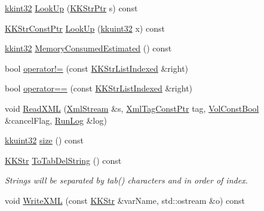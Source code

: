 \begin{DoxyCompactItemize}
\item 
\hyperlink{namespace_k_k_b_a8fa4952cc84fda1de4bec1fbdd8d5b1b}{kkint32} \hyperlink{class_k_k_b_1_1_k_k_str_list_indexed_a3db7042e0af80cc5a65720ab7dcba07b}{Look\+Up} (\hyperlink{namespace_k_k_b_a9adbef5a6b3be0867f5570df2a08f388}{K\+K\+Str\+Ptr} s) const 
\item 
\hyperlink{namespace_k_k_b_a46f665ec17615c856eff3d21f78bed5c}{K\+K\+Str\+Const\+Ptr} \hyperlink{class_k_k_b_1_1_k_k_str_list_indexed_a32cda8a56ca9424ad7c2ca470470ff88}{Look\+Up} (\hyperlink{namespace_k_k_b_af8d832f05c54994a1cce25bd5743e19a}{kkuint32} x) const 
\item 
\hyperlink{namespace_k_k_b_a8fa4952cc84fda1de4bec1fbdd8d5b1b}{kkint32} \hyperlink{class_k_k_b_1_1_k_k_str_list_indexed_a7dfe62ac389496c413536f8ef8b7d3eb}{Memory\+Consumed\+Estimated} () const 
\item 
bool \hyperlink{class_k_k_b_1_1_k_k_str_list_indexed_a777d372fc204f084f316e9de83deb56c}{operator!=} (const \hyperlink{class_k_k_b_1_1_k_k_str_list_indexed}{K\+K\+Str\+List\+Indexed} \&right)
\item 
bool \hyperlink{class_k_k_b_1_1_k_k_str_list_indexed_a1088be682832cebea569c5879835241f}{operator==} (const \hyperlink{class_k_k_b_1_1_k_k_str_list_indexed}{K\+K\+Str\+List\+Indexed} \&right)
\item 
void \hyperlink{class_k_k_b_1_1_k_k_str_list_indexed_a9861b9df2fd0c82c3139cfbdf2754ae7}{Read\+X\+ML} (\hyperlink{class_k_k_b_1_1_xml_stream}{Xml\+Stream} \&s, \hyperlink{namespace_k_k_b_a5f1b0b1667d79fec26deeff10c43df23}{Xml\+Tag\+Const\+Ptr} tag, \hyperlink{namespace_k_k_b_a7d390f568e2831fb76b86b56c87bf92f}{Vol\+Const\+Bool} \&cancel\+Flag, \hyperlink{class_k_k_b_1_1_run_log}{Run\+Log} \&log)
\item 
\hyperlink{namespace_k_k_b_af8d832f05c54994a1cce25bd5743e19a}{kkuint32} \hyperlink{class_k_k_b_1_1_k_k_str_list_indexed_acd0f65c79018c6a0a0cb512222412e17}{size} () const 
\item 
\hyperlink{class_k_k_b_1_1_k_k_str}{K\+K\+Str} \hyperlink{class_k_k_b_1_1_k_k_str_list_indexed_a38eb959748c287aecfc6d7e8743e7a39}{To\+Tab\+Del\+String} () const 
\begin{DoxyCompactList}\small\item\em Strings will be separated by tab() characters and in order of index. \end{DoxyCompactList}\item 
void \hyperlink{class_k_k_b_1_1_k_k_str_list_indexed_ac7fb41e7495f9b9b9f8733d87c69dda9}{Write\+X\+ML} (const \hyperlink{class_k_k_b_1_1_k_k_str}{K\+K\+Str} \&var\+Name, std\+::ostream \&o) const 
\end{DoxyCompactItemize}


